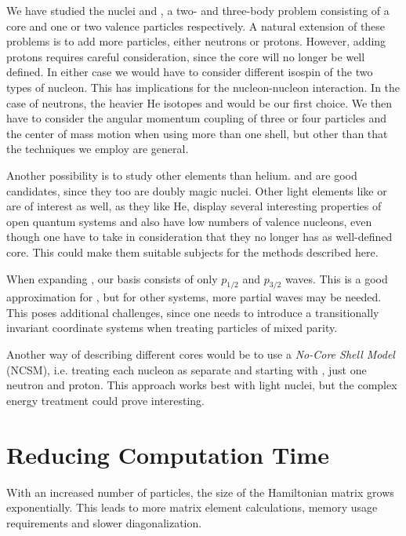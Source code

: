 \documentclass[../main/report.tex]{subfiles}
\begin{document}
We have studied the nuclei  and , a two- and three-body problem consisting of a core and one or two valence particles respectively.
A natural extension of these problems is to add more particles, either neutrons or protons. However, adding protons requires careful consideration, since the core will no longer be well defined. 
In either case we would have to consider different isospin of the two types of nucleon.
This has implications for the nucleon-nucleon interaction.
In the case of neutrons, the heavier He isotopes  and  would be our first choice.
We then have to consider the angular momentum coupling of three or four particles and the center of mass motion when using more than one shell, but other than that the techniques we employ are general.

Another possibility is to study other elements than helium.  and  are good candidates, since they too are doubly magic nuclei.
Other light elements like  or  are of interest as well, as they like He, display several interesting properties of open quantum systems and also have low numbers of valence nucleons, even though one have to take in consideration that they no longer has as well-defined core. 
This could make them suitable subjects for the methods described here.

When expanding , our basis consists of only $p_{1/2}$ and $p_{3/2}$ waves. 
This is a good approximation for  \cite{gamow_shell_model_2008},  but for other systems, more partial waves may be needed.
This poses additional challenges, since one needs to introduce a transitionally invariant coordinate systems when treating particles of mixed parity. 

Another way of describing different cores would be to use a \emph{No-Core Shell Model} (NCSM), i.e. treating each nucleon as separate and starting with , just one neutron and proton. 
This approach works best with light nuclei, but the complex energy treatment could prove interesting.

\section{Reducing Computation Time}
With an increased number of particles, the size of the Hamiltonian matrix grows exponentially. This leads to more matrix element calculations, memory usage requirements and slower diagonalization.
\end{document}

